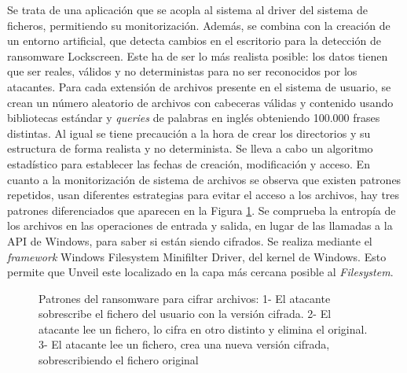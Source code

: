 Se trata de una aplicación que se acopla al sistema al driver del sistema de ficheros, permitiendo su monitorización. 
Además, se combina con la creación de un entorno artificial, que detecta cambios en el escritorio para la detección de ransomware Lockscreen. Este ha de ser lo más realista posible: los datos tienen que ser reales, válidos y no deterministas para no ser reconocidos por los atacantes. Para cada extensión de archivos presente en el sistema de usuario, se crean un número aleatorio de archivos con cabeceras válidas y contenido usando bibliotecas estándar y \textit{queries} de palabras en inglés obteniendo 100.000 frases distintas. Al igual se tiene precaución a la hora de crear los directorios y su estructura de forma realista y no determinista. Se lleva a cabo un algoritmo estadístico para establecer las fechas de creación, modificación y acceso.
En cuanto a la monitorización de sistema de archivos se observa que existen patrones repetidos, usan diferentes estrategias para evitar el acceso a los archivos, hay tres patrones diferenciados que aparecen en la Figura \ref{fig:im12}. Se comprueba la entropía de los archivos en las operaciones de entrada y salida, en lugar de las llamadas a la \gls{API} de Windows, para saber si están siendo cifrados. Se realiza mediante el \textit{framework} Windows Filesystem Minifilter Driver, del kernel de Windows. Esto permite que Unveil este localizado en la capa más cercana posible al \textit{Filesystem}.

\begin{figure}[h!]
\begin{center}
{}
\end{center}
\caption{Patrones del ransomware para cifrar archivos: 1- El atacante sobrescribe el fichero del usuario con la versión cifrada. 2- El atacante lee un fichero, lo cifra en otro distinto y elimina el original. 3- El atacante lee un fichero, crea una nueva versión cifrada, sobrescribiendo el fichero original }
\label{fig:im12}
\end{figure}

